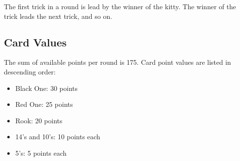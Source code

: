 \documentclass[10pt]{article}
\begin{document}
The first trick in a round is lead by the winner of the kitty.
The winner of the trick leads the next trick, and so on.

\subsection{Card Values}

The sum of available points per round is 175.
Card point values are listed in descending order:
\begin{itemize}
    \item Black One: 30 points
    \item Red One: 25 points
    \item Rook: 20 points
    \item 14's and 10's: 10 points each
    \item 5's: 5 points each
\end{itemize}
\end{document}
